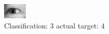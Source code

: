 \begin{figure}[h!]
\begin{center}
\includegraphics[width=0.60\columnwidth]{figures/ID3104_class_3_target_4.png}
\end{center}
\caption{ Classification: 3 actual target: 4}
\label{fig:ID3104_class_3_target_4}
\end{figure}

